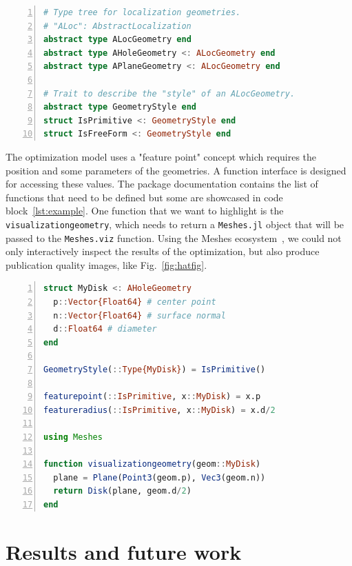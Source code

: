 \documentclass{juliacon}
\begin{document}
\begin{lstlisting}[language = Julia, numbers=left, label={lst:def-types}, caption={Shortened implementation of the type system used by \texttt{BlankLocalizationCore.jl}.}]
# Type tree for localization geometries.
# "ALoc": AbstractLocalization
abstract type ALocGeometry end
abstract type AHoleGeometry <: ALocGeometry end
abstract type APlaneGeometry <: ALocGeometry end

# Trait to describe the "style" of an ALocGeometry.
abstract type GeometryStyle end
struct IsPrimitive <: GeometryStyle end
struct IsFreeForm <: GeometryStyle end
\end{lstlisting}

The optimization model uses a "feature point" concept which requires the position and some parameters of the geometries.
A function interface is designed for accessing these values.
The package documentation contains the list of functions that need to be defined but some are showcased in code block~\ref{lst:example}.
One function that we want to highlight is the \texttt{visualizationgeometry}, which needs to return a \texttt{Meshes.jl} object that will be passed to the \texttt{Meshes.viz} function.
Using the Meshes ecosystem~\cite{Hoffimann2023}, we could not only interactively inspect the results of the optimization, but also produce publication quality images, like Fig.~\ref{fig:hatfig}.

\vspace*{1em}

\begin{lstlisting}[language = Julia, numbers=left, label={lst:example}, caption={Defining a new type for the optimization model.}]
struct MyDisk <: AHoleGeometry
  p::Vector{Float64} # center point
  n::Vector{Float64} # surface normal
  d::Float64 # diameter
end

GeometryStyle(::Type{MyDisk}) = IsPrimitive()

featurepoint(::IsPrimitive, x::MyDisk) = x.p
featureradius(::IsPrimitive, x::MyDisk) = x.d/2

using Meshes

function visualizationgeometry(geom::MyDisk)
  plane = Plane(Point3(geom.p), Vec3(geom.n))
  return Disk(plane, geom.d/2)
end
\end{lstlisting}

\section{Results and future work}
\label{sec:results}
\end{document}
